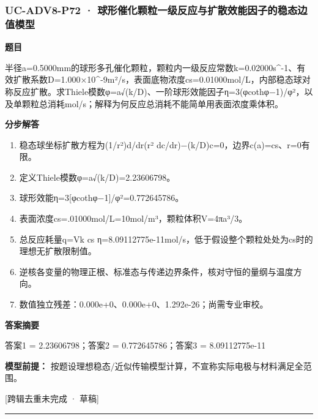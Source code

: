 \documentclass[UTF8,11pt,a4paper]{ctexart}
\begin{document}
\subsubsection*{UC-ADV8-P72 · 球形催化颗粒一级反应与扩散效能因子的稳态边值模型}
\noindent\textbf{题目}\par
半径a=0.5000mm的球形多孔催化颗粒，颗粒内一级反应常数k=0.02000s\textasciicircum{}-1、有效扩散系数D=1.000×10\textasciicircum{}-9m²/s，表面底物浓度cs=0.01000mol/L，内部稳态球对称反应扩散。求Thiele模数φ=a√(k/D)、一阶球形效能因子η=3(φcothφ−1)/φ²，以及单颗粒总消耗mol/s；解释为何反应总消耗不能简单用表面浓度乘体积。\par
\medskip\noindent\textbf{分步解答}
\begin{enumerate}
\item 稳态球坐标扩散方程为(1/r²)d/dr(r² dc/dr)−(k/D)c=0，边界c(a)=cs、r=0有限。
\item 定义Thiele模数φ=a√(k/D)=2.23606798。
\item 球形效能η=3[φcothφ−1]/φ²=0.772645786。
\item 表面浓度cs=.01000mol/L=10mol/m³，颗粒体积V=4πa³/3。
\item 总反应耗量q=Vk cs η=8.09112775e-11mol/s，低于假设整个颗粒处处为cs时的理想无扩散限制值。
\item 逆核各变量的物理正根、标准态与传递边界条件，核对守恒的量纲与温度方向。
\item 数值独立残差：0.000e+0、0.000e+0、1.292e-26；尚需专业审校。
\end{enumerate}
\noindent\textbf{答案摘要}\par
答案1 = 2.23606798；答案2 = 0.772645786；答案3 = 8.09112775e-11\par
\noindent\textbf{模型前提：}
按题设理想稳态/近似传输模型计算，不宣称实际电极与材料满足全范围。\par
\noindent\textcolor{red!65!black}{[跨辑去重未完成 · 草稿]} \par
\medskip\hrule\medskip
\end{document}
